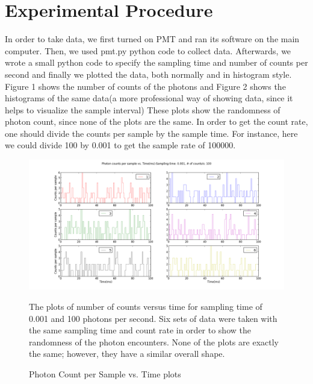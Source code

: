 \documentclass[letterpaper,12pt]{article}
\begin{document}
\section{Experimental Procedure}
\label{sec:experimental procedure}
In order to take data, we first turned on PMT and ran its software on the main computer. Then, we used pmt.py python code to collect data. Afterwards, we wrote a small python code to  specify the sampling time and number of counts per second and finally we plotted the data, both normally and in histogram style. Figure 1 shows the number of counts of the photons and Figure 2 shows the histograms of the same data(a more professional way of showing data, since it helps to visualize the sample interval) These plots show the randomness of photon count, since none of the plots are the same. In order to get the count rate, one should divide the counts per sample by the sample time. For instance, here we could divide 100 by 0.001 to get the sample rate of 100000.
\begin{figure}
\centering
\includegraphics[scale=0.7]{ex_1_plot_1.png}
\caption{ Photon Count per Sample vs. Time plots}
The plots of number of counts versus time for sampling time of 0.001 and 100 photons per second. Six sets of data were taken with the same sampling time and count rate in order to show the randomness of the photon encounters. None of the plots are exactly the same; however, they have a similar overall shape.
\end{figure}
\end{document}

